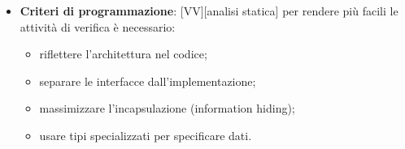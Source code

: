 \begin{itemize}
		\item \textbf{Criteri di programmazione}: [VV][analisi statica] per rendere più facili le attività di verifica è necessario:
			\begin{itemize}
				\item riflettere l'architettura nel codice;
				\item separare le interfacce dall'implementazione;
				\item massimizzare l'incapsulazione (information hiding);
				\item usare tipi specializzati per specificare dati. 
			\end{itemize}
	\end{itemize}